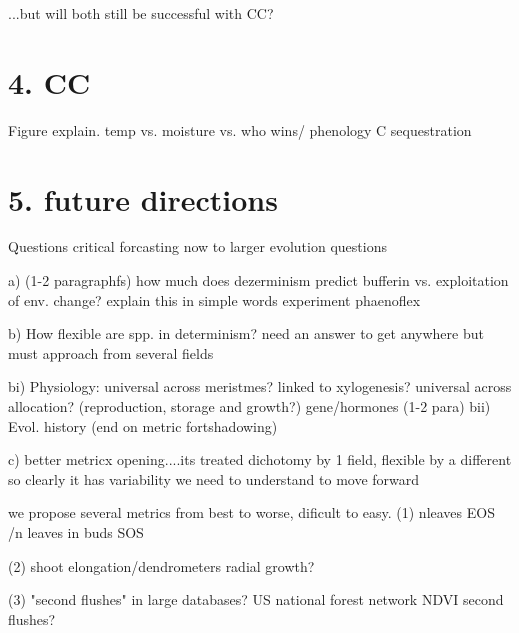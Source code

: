 \documentclass{article}
\begin{document}
...but will both still be successful with CC?

\section{4. CC }
Figure explain. temp vs. moisture vs. who wins/ phenology
C sequestration
\section{5. future directions}
Questions critical forcasting now to larger evolution questions

a) (1-2 paragraphfs) how much does dezerminism predict bufferin vs. exploitation of env. change?
explain this in simple words
experiment phaenoflex

b) How flexible are spp. in determinism?
need an answer to get anywhere but must approach from several fields

bi) Physiology: universal across meristmes? linked to xylogenesis?
universal across allocation? (reproduction, storage and growth?)
gene/hormones (1-2 para)
bii) Evol. history (end on metric fortshadowing)

c) better metricx
opening....its treated dichotomy by 1 field, flexible by a different so clearly it has variability we need to understand to move forward

we propose several metrics from best to worse, dificult to easy.
(1) nleaves  EOS /n leaves in buds SOS

(2) shoot elongation/dendrometers radial growth? 

(3) "second flushes" in large databases? US national forest network 
NDVI second flushes?
 
\end{document}
